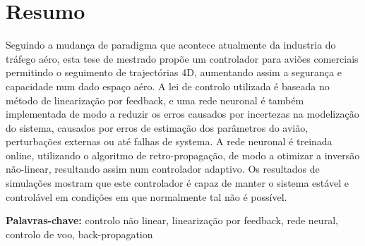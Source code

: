 
\section*{Resumo}


Seguindo a mudança de paradigma que acontece atualmente da industria do tráfego aéro, esta tese de mestrado propõe um controlador para aviões comerciais permitindo o seguimento de trajectórias 4D, aumentando assim a segurança e capacidade num dado espaço aéro. A lei de controlo utilizada é baseada no método de linearização por feedback, e uma rede neuronal é também implementada de modo a reduzir os erros causados por incertezas na modelização do sistema, causados por erros de estimação dos parâmetros do avião, perturbações externas ou até falhas de systema. A rede neuronal é treinada online, utilizando o algoritmo de retro-propagação, de modo a otimizar a inversão não-linear, resultando assim num controlador adaptivo. Os resultados de simulações mostram que este controlador é capaz de manter o sistema estável e controlável em condições em que normalmente tal não é possível.

\vfill

\textbf{\Large Palavras-chave:} controlo não linear, linearização por feedback, rede neural, controlo de voo, back-propagation

